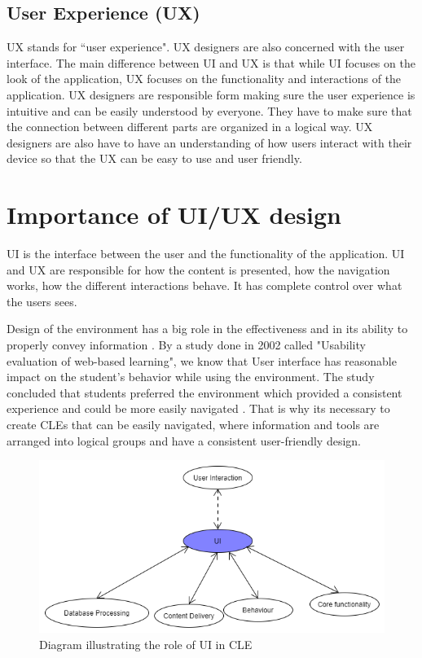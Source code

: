 \documentclass[10pt,english,a4paper]{article}
\begin{document}
\subsection{User Experience (UX)}
UX stands for ``user experience". UX designers are also concerned with the user interface\cite{theymakedesign_2019_what}. 
The main difference between UI and UX is that while UI focuses on the look of the application,
UX focuses on the functionality and interactions of the application. UX designers are 
responsible form making sure the user experience is intuitive and can be easily understood by everyone.
They have to make sure that the connection between different parts are organized in a logical way.
UX designers are also have to have an understanding of how users interact with their
device so that the UX can be easy to use and user friendly\cite{theymakedesign_2019_what}. 

\section{Importance of UI/UX design}\label{importance}
UI is the interface between the user and the functionality of the application. UI and UX are responsible for
how the content is presented, how the navigation works, how the different interactions behave. It 
has complete control over what the users sees.


Design of the environment has a big role in the effectiveness and in 
its ability to properly convey information \cite{ui/ux}. 
By a study done in 2002 called "Usability evaluation of web-based learning", we know that User interface
has reasonable impact on the student's behavior while using the environment\cite{wesson_2002_usability}.
The study concluded that students preferred the environment which provided a consistent experience and could be more easily navigated 
\cite{wesson_2002_usability}. That is why its necessary to create CLEs that can be easily navigated,
where information and tools are arranged into logical groups and have a consistent user-friendly design.

\begin{figure}[h]
    \includegraphics[width=1\textwidth]{images/ui-diagram.png}
    \caption{Diagram illustrating the role of UI in CLE}
\end{figure}
\end{document}
